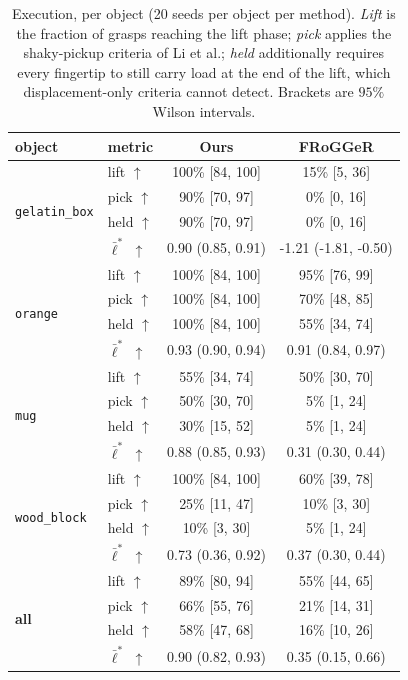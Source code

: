 \begin{table}[t]
\centering
\caption{Execution, per object (20 seeds per object per method). \emph{Lift} is the
fraction of grasps reaching the lift phase; \emph{pick} applies the shaky-pickup
criteria of Li et al.; \emph{held} additionally requires every fingertip to still
carry load at the end of the lift, which displacement-only criteria cannot detect.
Brackets are $95\%$ Wilson intervals.}
\label{tab:execution}
\small
\setlength{\tabcolsep}{3pt}
\begin{tabular}{@{}llcc@{}}
\toprule
object & metric & \textbf{Ours} & FRoGGeR \\
\midrule
\multirow{4}{*}{\texttt{gelatin\_box}} & lift $\uparrow$ & 100\% [84, 100] & 15\% [5, 36] \\
 & pick $\uparrow$ & 90\% [70, 97] & 0\% [0, 16] \\
 & held $\uparrow$ & 90\% [70, 97] & 0\% [0, 16] \\
 & $\bar{\ell}^*$ $\uparrow$ & 0.90 (0.85, 0.91) & -1.21 (-1.81, -0.50) \\
\midrule
\multirow{4}{*}{\texttt{orange}} & lift $\uparrow$ & 100\% [84, 100] & 95\% [76, 99] \\
 & pick $\uparrow$ & 100\% [84, 100] & 70\% [48, 85] \\
 & held $\uparrow$ & 100\% [84, 100] & 55\% [34, 74] \\
 & $\bar{\ell}^*$ $\uparrow$ & 0.93 (0.90, 0.94) & 0.91 (0.84, 0.97) \\
\midrule
\multirow{4}{*}{\texttt{mug}} & lift $\uparrow$ & 55\% [34, 74] & 50\% [30, 70] \\
 & pick $\uparrow$ & 50\% [30, 70] & 5\% [1, 24] \\
 & held $\uparrow$ & 30\% [15, 52] & 5\% [1, 24] \\
 & $\bar{\ell}^*$ $\uparrow$ & 0.88 (0.85, 0.93) & 0.31 (0.30, 0.44) \\
\midrule
\multirow{4}{*}{\texttt{wood\_block}} & lift $\uparrow$ & 100\% [84, 100] & 60\% [39, 78] \\
 & pick $\uparrow$ & 25\% [11, 47] & 10\% [3, 30] \\
 & held $\uparrow$ & 10\% [3, 30] & 5\% [1, 24] \\
 & $\bar{\ell}^*$ $\uparrow$ & 0.73 (0.36, 0.92) & 0.37 (0.30, 0.44) \\
\midrule
\multirow{4}{*}{\textbf{all}} & lift $\uparrow$ & 89\% [80, 94] & 55\% [44, 65] \\
 & pick $\uparrow$ & 66\% [55, 76] & 21\% [14, 31] \\
 & held $\uparrow$ & 58\% [47, 68] & 16\% [10, 26] \\
 & $\bar{\ell}^*$ $\uparrow$ & 0.90 (0.82, 0.93) & 0.35 (0.15, 0.66) \\
\bottomrule
\end{tabular}
\end{table}

